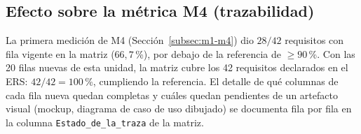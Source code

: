 \subsection{Efecto sobre la métrica M4 (trazabilidad)}
\label{sec:efecto-m4}

La primera medición de M4 (Sección~\ref{subsec:m1-m4}) dio $28/42$ requisitos con fila vigente en la
matriz ($66{,}7$\,\%), por debajo de la referencia de $\geq 90$\,\%. Con las 20 filas nuevas de
esta unidad, la matriz cubre los 42 requisitos declarados en el ERS: $42/42 = 100$\,\%,
cumpliendo la referencia. El detalle de qué columnas de cada fila nueva quedan completas y cuáles
quedan pendientes de un artefacto visual (mockup, diagrama de caso de uso dibujado) se documenta
fila por fila en la columna \texttt{Estado\_de\_la\_traza} de la matriz.
